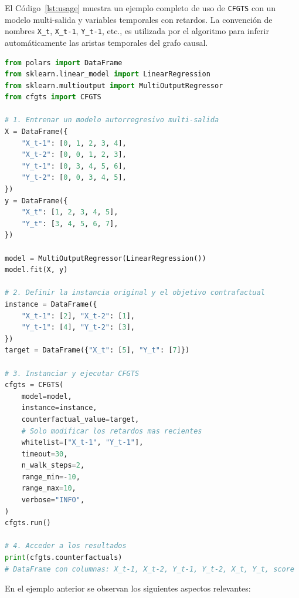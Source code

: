 \documentclass[12pt]{report} %
\begin{document}
El Código~\ref{lst:usage} muestra un ejemplo completo de uso de \texttt{CFGTS} con un modelo multi-salida y variables temporales con retardos. La convención de nombres \texttt{X\_t}, \texttt{X\_t-1}, \texttt{Y\_t-1}, etc., es utilizada por el algoritmo para inferir automáticamente las aristas temporales del grafo causal.

\begin{lstlisting}[language=Python, caption={Ejemplo de uso de \texttt{CFGTS} con series temporales}, label={lst:usage}]
from polars import DataFrame
from sklearn.linear_model import LinearRegression
from sklearn.multioutput import MultiOutputRegressor
from cfgts import CFGTS

# 1. Entrenar un modelo autorregresivo multi-salida
X = DataFrame({
    "X_t-1": [0, 1, 2, 3, 4],
    "X_t-2": [0, 0, 1, 2, 3],
    "Y_t-1": [0, 3, 4, 5, 6],
    "Y_t-2": [0, 0, 3, 4, 5],
})
y = DataFrame({
    "X_t": [1, 2, 3, 4, 5],
    "Y_t": [3, 4, 5, 6, 7],
})

model = MultiOutputRegressor(LinearRegression())
model.fit(X, y)

# 2. Definir la instancia original y el objetivo contrafactual
instance = DataFrame({
    "X_t-1": [2], "X_t-2": [1],
    "Y_t-1": [4], "Y_t-2": [3],
})
target = DataFrame({"X_t": [5], "Y_t": [7]})

# 3. Instanciar y ejecutar CFGTS
cfgts = CFGTS(
    model=model,
    instance=instance,
    counterfactual_value=target,
    # Solo modificar los retardos mas recientes
    whitelist=["X_t-1", "Y_t-1"],
    timeout=30,
    n_walk_steps=2,
    range_min=-10,
    range_max=10,
    verbose="INFO",
)
cfgts.run()

# 4. Acceder a los resultados
print(cfgts.counterfactuals)
# DataFrame con columnas: X_t-1, X_t-2, Y_t-1, Y_t-2, X_t, Y_t, score
\end{lstlisting}

En el ejemplo anterior se observan los siguientes aspectos relevantes:
\end{document}
